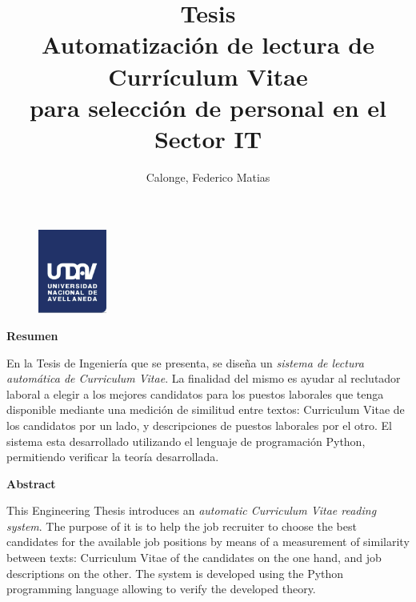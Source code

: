 \documentclass[12pt,a4paper]{article}
\author{
  Calonge, Federico Matias\\
  \text{calongefederico@gmail.com}
}
\title{
  Tesis \\
  \large Automatización de lectura de Currículum Vitae  \\
    para selección de personal en el Sector IT}
\begin{document}
\begin{figure}
  \centering
  \includegraphics[width=0.2\textwidth]{images/undav-logo.png} 	%
  \label{fig:undav-logo}
\end{figure}
\maketitle       		%

\cleardoublepage    %

\begin{center}
    \Large
    \vspace{0.9cm}
    \textbf{Resumen}
    
\end{center}

En la Tesis de Ingeniería que se presenta, se diseña un \textit{sistema de lectura automática de Curriculum Vitae}. La finalidad del mismo es ayudar al reclutador laboral a elegir a los mejores candidatos para los puestos laborales que tenga disponible mediante una medición de similitud entre textos: Curriculum Vitae de los candidatos por un lado, y descripciones de puestos laborales por el otro.
El sistema esta desarrollado utilizando el lenguaje de programación Python, permitiendo verificar la teoría desarrollada.

\begin{center}
    \Large
    \vspace{0.9cm}
    \textbf{Abstract}
\end{center}

This Engineering Thesis introduces an \textit{automatic Curriculum Vitae reading system}. The purpose of it is to help the job recruiter to choose the best candidates for the available job positions by means of a measurement of similarity between texts: Curriculum Vitae of the candidates on the one hand, and job descriptions on the other. The system is developed using the Python programming language allowing to verify the developed theory.

\cleardoublepage    %

\tableofcontents 	%
\end{document}
